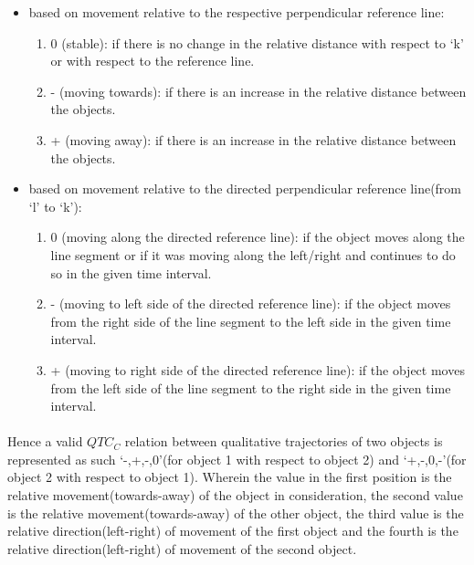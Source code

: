 	\begin{itemize}
		\item based on movement relative to the respective perpendicular reference line:
		
		\begin{enumerate}
			\item 0 (stable): if there is no change in the relative distance with respect to `k' or with respect to the reference line. 
			
			\item - (moving towards): if there is an increase in the relative distance between the objects.
			
			\item + (moving away): if there is an increase in the relative distance between the objects.
		\end{enumerate}
	
		\item  based on movement relative to the directed perpendicular reference line(from `l' to `k'):
		
		\begin{enumerate}
			\item 0 (moving along the directed reference line): if the object moves
			along the line segment or if it was moving along the left/right and continues to do so in the given time interval.
			
			\item - (moving to left side of the directed reference line): if the object moves from the right side of the line segment to the left side in the given time interval.
			
			\item + (moving to right side of the directed reference line): if the object moves from the left side of the line segment to the right side in the given time interval.
		\end{enumerate}
	
	\end{itemize}

	\paragraph{}Hence a valid $QTC_C$ relation between qualitative trajectories of two objects is represented as such `{-,+,-,0}'(for object 1 with respect to object 2) and `{+,-,0,-}'(for object 2 with respect to object 1). Wherein the value in the first position is the relative movement(towards-away) of the object in consideration, the second value is the relative movement(towards-away) of the other object, the third value is the relative direction(left-right) of movement of the first object and the fourth is the relative direction(left-right) of movement of the second object.
	
